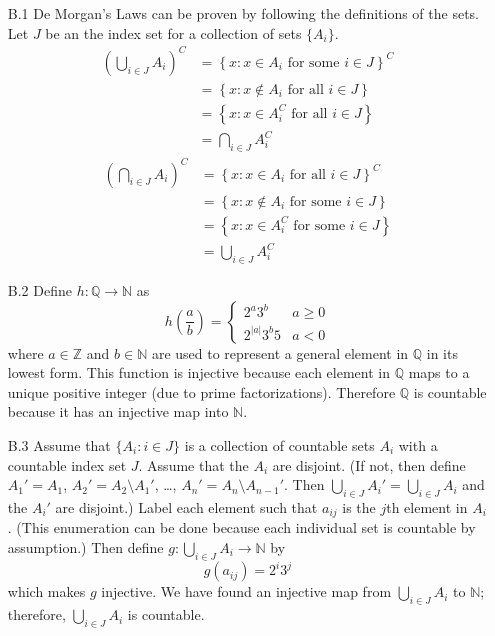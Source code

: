 \documentclass[../../Solutions.tex]{subfiles}
\begin{document}
\begin{itemize}
	\item [B.1] De Morgan's Laws can be proven by following the definitions of the sets.
	Let $J$ be an the index set for a collection of sets $\{A_i\}$.
	\begin{equation*} \begin{split}
		\left( \bigcup_{i \in J} A_i \right)^C & = \left\{ x : x \in A_i \text{ for some } i \in J \right\}^C \\
			& = \left\{ x : x \not\in A_i \text{ for all } i \in J \right\} \\
			& = \left\{ x : x \in A_i^C \text{ for all } i \in J \right\} \\
			& = \bigcap_{i \in J} A_i^C
	\end{split} \end{equation*}
	\begin{equation*} \begin{split}
	\left( \bigcap_{i \in J} A_i \right)^C & = \left\{ x : x \in A_i \text{ for all } i \in J \right\}^C \\
	& = \left\{ x : x \not\in A_i \text{ for some } i \in J \right\} \\
	& = \left\{ x : x \in A_i^C \text{ for some } i \in J \right\} \\
	& = \bigcup_{i \in J} A_i^C
	\end{split} \end{equation*}
	
	\item [B.2] Define $h:\mathbb{Q} \to \mathbb{N}$ as
	$$ h\left(\frac{a}{b}\right) = \begin{cases}
		2^a3^b & a \geq 0 \\
		2^{|a|}3^b5 & a < 0
	\end{cases} $$
	where $a \in \mathbb{Z}$ and $b \in \mathbb{N}$ are used to represent a general element in $\mathbb{Q}$ in its lowest form.
	This function is injective because each element in $\mathbb{Q}$ maps to a unique positive integer (due to prime factorizations).
	Therefore $\mathbb{Q}$ is countable because it has an injective map into $\mathbb{N}$.
	
	\item [B.3] Assume that $\{ A_i : i \in J \}$ is a collection of countable sets $A_i$ with a countable index set $J$.
	Assume that the $A_i$ are disjoint.
	(If not, then define $A_1' = A_1$, $A_2' = A_2 \setminus A_1'$, \dots, $A_n' = A_n \setminus A_{n-1}'$.
	Then $\bigcup_{i\in J}A_i' = \bigcup_{i\in J}A_i$ and the $A_i'$ are disjoint.)
	Label each element such that $a_{ij}$ is the $j$th element in $A_i$.
	(This enumeration can be done because each individual set is countable by assumption.)
	Then define $g:\bigcup_{i\in J} A_i \to \mathbb{N}$ by
	$$ g(a_{ij}) = 2^i3^j $$
	which makes $g$ injective.
	We have found an injective map from $\bigcup_{i\in J} A_i$ to $\mathbb{N}$;
	therefore, $\bigcup_{i\in J} A_i$ is countable.
	

\end{itemize}
\end{document}
